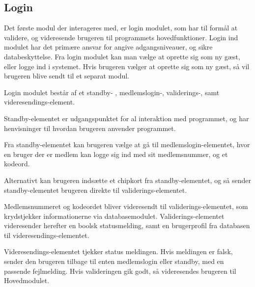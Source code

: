 \subsection{Login}
\label{sub:database}

Det første modul der interageres med, er login modulet, som har til formål at validere, og videresende brugeren til programmets hovedfunktioner. Login ind modulet har det primære ansvar for angive adgangsniveauer, og sikre databeskyttelse. Fra login modulet kan man vælge at oprette sig som ny gæst, eller logge ind i systemet. Hvis brugeren vælger at oprette sig som ny gæst, så vil brugeren blive sendt til et separat modul.

Login modulet består af et standby- , medlemslogin-, validerings-, samt videresendings-element.

Standby-elementet er udgangspunktet for al interaktion med programmet, og har henvisninger til hvordan brugeren anvender programmet. 

Fra standby-elementet kan brugeren vælge at gå til medlemslogin-elementet, hvor en bruger der er medlem kan logge sig ind med sit medlemsnummer, og et kodeord.

Alternativt kan brugeren indsætte et chipkort fra standby-elementet, og så sender standby-elementet brugeren direkte til validerings-elementet.

Medlemsnummeret og kodeordet bliver videresendt til validerings-elementet, som krydstjekker informationerne via databasemodulet. Validerings-elementet videresender herefter en boolsk statusmelding, samt en brugerprofil fra databasen til videresendings-elementet.

Videresendings-elementet tjekker status meldingen. Hvis meldingen er falsk, sender den brugeren tilbage til enten medlemslogin eller standby, med en passende fejlmelding. Hvis valideringen gik godt, så videresendes brugeren til Hovedmodulet.